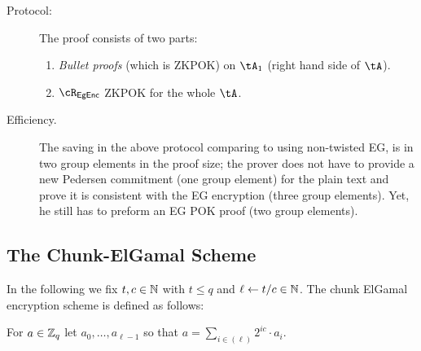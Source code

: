 \begin{description}
\begin{description}
		\item[Protocol:]  The proof consists of two parts:
		\begin{enumerate}
			\item  \textit{Bullet proofs} \cite{SP:BBBPWM18}  (which is  ZKPOK) on $\tA_1$ (\ie right hand side of $\tA$).   
			
			
			
			\item   $\rEgEnc$ ZKPOK  for the whole $\tA$.
			
			
		\end{enumerate}


\item[Efficiency.]
	The saving in the above protocol comparing to using  non-twisted EG, is in  two  group elements in the proof size;  the prover does not have to provide a new Pedersen commitment (one group element)  for the plain text and prove it is consistent with the EG encryption (three group elements). Yet, he still has to preform an EG POK proof (two group elements).
		
	\end{description}

\end{description}





	
\subsection{The Chunk-ElGamal  Scheme}\label{sec:ChanksEg:EgScheme}
In the following we fix $t,c\in {\mathbb{N}}$ with $t\le q$ and $\ell \leftarrow t/c \in {\mathbb{N}}$. The chunk ElGamal encryption scheme  is defined as follows:



\begin{definition}\label{def:basefactor}
For $a\in {\mathbb Z}_q$ let $a_0,\ldots,a_{\ell-1}$ so that $a =  \sum_{i \in (\ell)}    2^{i c} \cdot a_i$.
\end{definition}


